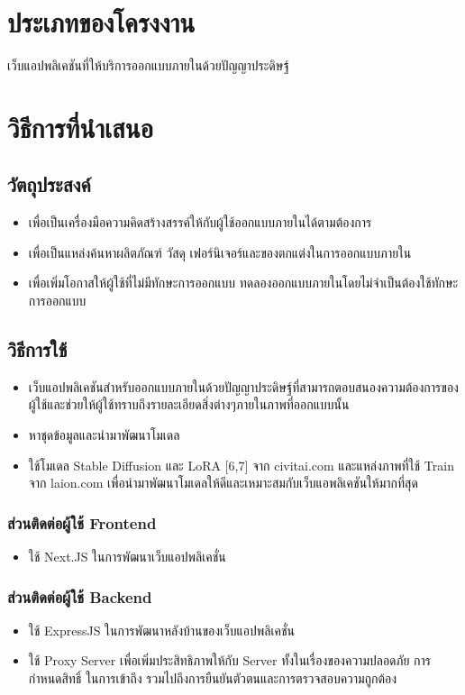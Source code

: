 \documentclass[12pt,oneside,openright,a4paper]{cpe-thai-project}
\begin{document}
\section{ประเภทของโครงงาน}
เว็บแอปพลิเคชันที่ให้บริการออกแบบภายในด้วยปัญญาประดิษฐ์

\section{วิธีการที่นำเสนอ}

\subsection{วัตถุประสงค์}
\begin{itemize}
\item เพื่อเป็นเครื่องมือความคิดสร้างสรรค์ให้กับผู้ใช้ออกแบบภายในได้ตามต้องการ
\item เพื่อเป็นแหล่งค้นหาผลิตภัณฑ์ วัสดุ เฟอร์นิเจอร์และของตกแต่งในการออกแบบภายใน
\item เพื่อเพิ่มโอกาสให้ผู้ใช้ที่ไม่มีทักษะการออกแบบ ทดลองออกแบบภายในโดยไม่จำเป็นต้องใช้ทักษะการออกแบบ
\end{itemize}

\subsection{วิธีการใช้}
\begin{itemize}
\item เว็บแอปพลิเคชันสำหรับออกแบบภายในด้วยปัญญาประดิษฐ์ที่สามารถตอบสนองความต้องการของผู้ใช้และช่วยให้ผู้ใช้ทราบถึงรายละเอียดสิ่งต่างๆภายในภาพที่ออกแบบนั้น
\item หาชุดข้อมูลและนำมาพัฒนาโมเดล
\item ใช้โมเดล Stable Diffusion และ LoRA [6,7] จาก civitai.com และแหล่งภาพที่ใช้ Train จาก laion.com เพื่อนำมาพัฒนาโมเดลให้ดีและเหมาะสมกับเว็บแอพลิเคชันให้มากที่สุด
\end{itemize}


\subsubsection{ส่วนติดต่อผู้ใช้ Frontend}
\begin{itemize}
\item ใช้ Next.JS ในการพัฒนาเว็บแอปพลิเคชั่น
\end{itemize}

\subsubsection{ส่วนติดต่อผู้ใช้ Backend}
\begin{itemize}
\item ใช้ ExpressJS ในการพัฒนาหลังบ้านของเว็บแอปพลิเคชั่น
\item ใช้ Proxy Server เพื่อเพิ่มประสิทธิภาพให้กับ Server ทั้งในเรื่องของความปลอดภัย การกำหนดสิทธิ์ ในการเข้าถึง รวมไปถึงการยืนยันตัวตนและการตรวจสอบความถูกต้อง
\end{itemize}
\end{document}
